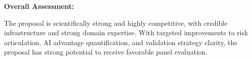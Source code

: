 \documentclass[11pt]{article}
\begin{document}
\bigskip

\textbf{Overall Assessment:}

The proposal is scientifically strong and highly competitive, with credible infrastructure and strong domain expertise. With targeted improvements to risk articulation, AI advantage quantification, and validation strategy clarity, the proposal has strong potential to receive favorable panel evaluation.
\end{document}
